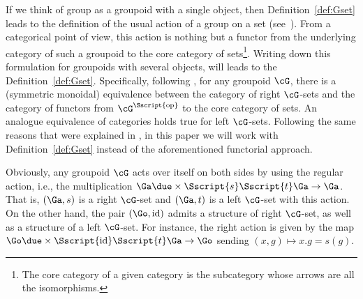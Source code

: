 \begin{Remark}\label{rem:GrpdSets}If we think of group as a groupoid with a single object, then Definition~\ref{def:Gset} leads to the definition of the usual action of a group on a set (see~\cite{Bouc:2010}). From a categorical point of view, this action is nothing but a functor from the underlying category of such a groupoid to the core category of sets\footnote{The core category of a given category is the subcategory whose arrows are all the isomorphisms.}. Writing down this formulation for groupoids with several objects, will leads to the Definition~\ref{def:Gset}. Specifically, following \cite[Remark~2.6]{Kaoutit/Spinosa:2018}, for any groupoid $\cG$, there is a (symmetric monoidal) equivalence between the category of right $\cG$-sets and the category of functors from $\cG^{\Sscript{\rm op}}$ to the core category of sets. An analogue equivalence of categories holds true for left $\cG$-sets. Following the same reasons that were explained in \cite[Remark 2.6, Section~5.3]{Kaoutit/Spinosa:2018}, in this paper we will work with Definition~\ref{def:Gset} instead of the aforementioned functorial approach.
\end{Remark}

Obviously, any groupoid $\cG$ acts over itself on both sides by using the regular action, i.e., the multiplication $\Ga \due \times {\Sscript{{s}}} { \Sscript{{t}}} \Ga \to \Ga$. That is, $(\Ga, {s})$ is a right $\cG$-set and $(\Ga, {t})$ is a left $\cG$-set with this action. On the other hand, the pair $(\Go, {\rm id})$ admits a structure of right $\cG$-set, as well as a structure of a left $\cG$-set. For instance, the right action is given by the map $\Go \due \times {\Sscript{{\rm id}}} { \Sscript{{t}}} \Ga \to \Go$ sending $(x,g) \mapsto x . g= s(g)$.

